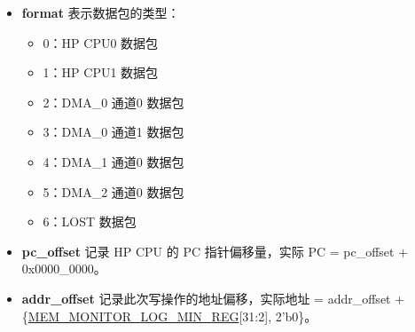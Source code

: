 \documentclass[main\_\_CN.tex]{subfiles}
\begin{document}
\begin{itemize}
    \item \textbf{format} 表示数据包的类型：
        \begin{itemize}
            \item 0：HP CPU0 数据包
            \item 1：HP CPU1 数据包
            \item 2：DMA\_0 通道0 数据包
            \item 3：DMA\_0 通道1 数据包
            \item 4：DMA\_1 通道0 数据包
            \item 5：DMA\_2 通道0 数据包
            \item 6：LOST 数据包
        \end{itemize}
    \item \textbf{pc\_offset} 记录 HP CPU 的 PC 指针偏移量，实际 PC = pc\_offset + 0x0000\_0000。
    \item \textbf{addr\_offset} 记录此次写操作的地址偏移，实际地址 = addr\_offset + \{\hyperref[regdesc:MEMMONITORLOGMINREG]{MEM\_MONITOR\_LOG\_MIN\_REG}[31:2], 2'b0\}。


\end{itemize}
\end{document}
